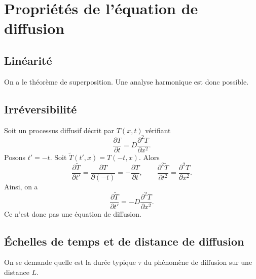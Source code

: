 \section{Propriétés de l'équation de diffusion}
    \subsection{Linéarité}

        On a le théorème de superposition. Une analyse harmonique est donc possible.

    \subsection{Irréversibilité}
        Soit un processus diffusif décrit par $T(x,t)$ vérifiant
        \begin{equation}
            \frac{\partial T}{\partial t}=D\frac{\partial^{2}T}{\partial x^{2}}.
        \end{equation}
        Posons $t'=-t$. Soit $\widetilde{T}(t',x)=T(-t,x)$. Alors
        \begin{equation}
            \frac{\partial\widetilde{T}}{\partial t'}=\frac{\partial T}{\partial(-t)}=-\frac{\partial T}{\partial t},\qquad\frac{\partial^{2}\widetilde{T}  }{\partial t^{2}}=\frac{\partial^{2}T}{\partial x^{2}}.
        \end{equation}
        Ainsi, on a 
        \begin{equation}
            \frac{\partial\widetilde{T}}{\partial t'}=-D\frac{\partial^{2}T}{\partial x^{2}}.
        \end{equation}
        Ce n'est donc pas une équation de diffusion.

    \subsection{Échelles de temps et de distance de diffusion}
        
        On se demande quelle est la durée typique $\tau$ du phénomène de diffusion sur une distance $L$.

